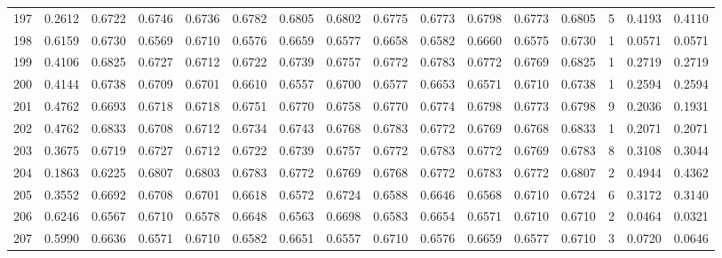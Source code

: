 \begin{tabular}{lrrrrrrrrrrrrrrr}
197 &      0.2612 &  0.6722 &  0.6746 &  0.6736 &  0.6782 &  0.6805 &  0.6802 &  0.6775 &  0.6773 &  0.6798 &   0.6773 &     0.6805 &      5 &                    0.4193 &                     0.4110 \\
198 &      0.6159 &  0.6730 &  0.6569 &  0.6710 &  0.6576 &  0.6659 &  0.6577 &  0.6658 &  0.6582 &  0.6660 &   0.6575 &     0.6730 &      1 &                    0.0571 &                     0.0571 \\
199 &      0.4106 &  0.6825 &  0.6727 &  0.6712 &  0.6722 &  0.6739 &  0.6757 &  0.6772 &  0.6783 &  0.6772 &   0.6769 &     0.6825 &      1 &                    0.2719 &                     0.2719 \\
200 &      0.4144 &  0.6738 &  0.6709 &  0.6701 &  0.6610 &  0.6557 &  0.6700 &  0.6577 &  0.6653 &  0.6571 &   0.6710 &     0.6738 &      1 &                    0.2594 &                     0.2594 \\
201 &      0.4762 &  0.6693 &  0.6718 &  0.6718 &  0.6751 &  0.6770 &  0.6758 &  0.6770 &  0.6774 &  0.6798 &   0.6773 &     0.6798 &      9 &                    0.2036 &                     0.1931 \\
202 &      0.4762 &  0.6833 &  0.6708 &  0.6712 &  0.6734 &  0.6743 &  0.6768 &  0.6783 &  0.6772 &  0.6769 &   0.6768 &     0.6833 &      1 &                    0.2071 &                     0.2071 \\
203 &      0.3675 &  0.6719 &  0.6727 &  0.6712 &  0.6722 &  0.6739 &  0.6757 &  0.6772 &  0.6783 &  0.6772 &   0.6769 &     0.6783 &      8 &                    0.3108 &                     0.3044 \\
204 &      0.1863 &  0.6225 &  0.6807 &  0.6803 &  0.6783 &  0.6772 &  0.6769 &  0.6768 &  0.6772 &  0.6783 &   0.6772 &     0.6807 &      2 &                    0.4944 &                     0.4362 \\
205 &      0.3552 &  0.6692 &  0.6708 &  0.6701 &  0.6618 &  0.6572 &  0.6724 &  0.6588 &  0.6646 &  0.6568 &   0.6710 &     0.6724 &      6 &                    0.3172 &                     0.3140 \\
206 &      0.6246 &  0.6567 &  0.6710 &  0.6578 &  0.6648 &  0.6563 &  0.6698 &  0.6583 &  0.6654 &  0.6571 &   0.6710 &     0.6710 &      2 &                    0.0464 &                     0.0321 \\
207 &      0.5990 &  0.6636 &  0.6571 &  0.6710 &  0.6582 &  0.6651 &  0.6557 &  0.6710 &  0.6576 &  0.6659 &   0.6577 &     0.6710 &      3 &                    0.0720 &                     0.0646 \\

\end{tabular}
